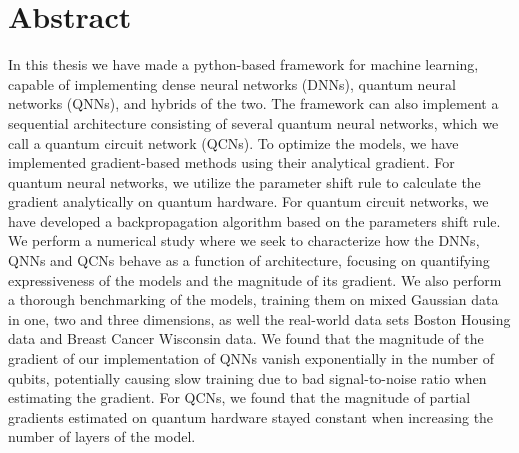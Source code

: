 \chapter*{Abstract}
\thispagestyle{plain}

In this thesis we have made a python-based framework for machine learning, capable of implementing dense neural networks (DNNs), quantum neural networks (QNNs), and hybrids of the two. The framework can also implement a sequential architecture consisting of several quantum neural networks, which we call a quantum circuit network (QCNs). To optimize the models, we have implemented gradient-based methods using their analytical gradient. For quantum neural networks, we utilize the parameter shift rule to calculate the gradient analytically on quantum hardware. For quantum circuit networks, we have developed a backpropagation algorithm based on the parameters shift rule. We perform a numerical study where we seek to characterize how the DNNs, QNNs and QCNs  behave as a function of architecture, focusing on quantifying expressiveness of the models and the magnitude of its gradient. We also perform a thorough benchmarking of the models, training them on mixed Gaussian data in one, two and three dimensions, as well the real-world data sets Boston Housing data and Breast Cancer Wisconsin data.
We found that the magnitude of the gradient of our implementation of QNNs vanish exponentially in the number of qubits, potentially causing slow training due to bad signal-to-noise ratio when estimating the gradient. For QCNs, we found that the magnitude of partial gradients estimated on quantum hardware stayed constant when increasing the number of layers of the model. 